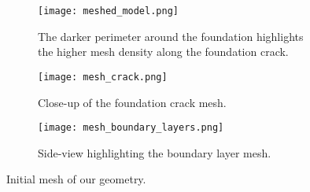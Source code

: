 \begin{figure}[htb!]
  \centering
  \begin{subfigure}[b]{\textwidth}
    \texttt{[image: meshed\_model.png]}
    \caption{The darker perimeter around the foundation highlights the higher mesh density along the foundation crack.}
    \label{fig:meshed_geometry}
  \end{subfigure}
  \begin{subfigure}[b]{\textwidth}
    \texttt{[image: mesh\_crack.png]}
    \caption{Close-up of the foundation crack mesh.}
    \label{fig:meshed_crack}
  \end{subfigure}
  \begin{subfigure}[b]{\textwidth}
    \texttt{[image: mesh\_boundary\_layers.png]}
    \caption{Side-view highlighting the boundary layer mesh.}
    \label{fig:mesh_boundary_layers}
  \end{subfigure}
  \caption{Initial mesh of our geometry.}
  \label{fig:mesh}
\end{figure}
